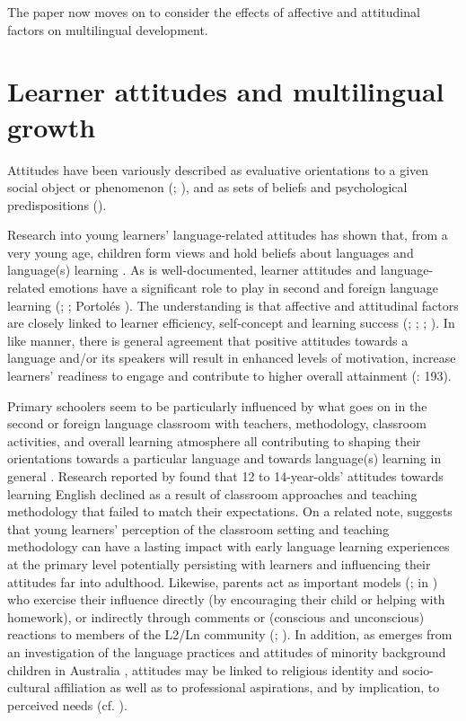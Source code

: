 \documentclass[output=paper]{../langscibook}
\begin{document}
The paper now moves on to consider the effects of affective and attitudinal factors on multilingual development.

\section{Learner attitudes and multilingual growth}


Attitudes have been variously described as evaluative orientations to a given social object or phenomenon (\citealt{Garret2010}; \citealt{Cenoz2004}), and as sets of beliefs and psychological predispositions (\citealt[124]{TodorDegi2016}). 

Research into young learners’ language-related attitudes has shown that, from a very young age, children form views and hold beliefs about languages and language(s) learning \citep{Munoz2014,NagyNikolov2009,Nikolov2009}. As is well-documented, learner attitudes and language-related emotions have a significant role to play in second and foreign language learning (\citealt[3]{CourtneyEtAl2017}; \citealt[58]{Culhane2004}; Portolés \citealt[77]{Falomir2015}). The understanding is that affective and attitudinal factors are closely linked to learner efficiency, self-concept and learning success (\citealt{DornyeiEtAl2015}; \citealt[197]{MacIntyreGregersen2012}; \citealt{MacintyreEtAl2016}; \citealt{Wesely2012}). In like manner, there is general agreement that positive attitudes towards a language and/or its speakers will result in enhanced levels of motivation, increase learners’ readiness to engage and contribute to higher overall attainment (\citealt{MacIntyreGregersen2012}: 193).

Primary schoolers seem to be particularly influenced by what goes on in the second or foreign language classroom with teachers, methodology, classroom activities, and overall learning atmosphere all contributing to shaping their orientations towards a particular language and towards language(s) learning in general \citep{Nikolov1999}. Research reported by \citet[155]{Chambers1999} found that 12 to 14-year-olds’ attitudes towards learning English declined as a result of classroom approaches and teaching methodology that failed to match their expectations. On a related note, \citet[107]{Wesely2012} suggests that young learners’ perception of the classroom setting and teaching methodology can have a lasting impact with early language learning experiences at the primary level potentially persisting with learners and influencing their attitudes far into adulthood. Likewise, parents act as important models (\citealt[205]{Cenoz2004}; \citealt{Gardner1985} in \citealt{CsizerKormos2009}) who exercise their influence directly (by encouraging their child or helping with homework), or indirectly through comments or (conscious and unconscious) reactions to members of the L2/Ln community (\citealt[83]{CsizerKormos2009}; \citealt[347]{OtwinowskaDeAngelis2012}). In addition, as emerges from an investigation of the language practices and attitudes of minority background children in Australia \citep[64]{Bissoonauth2018}, attitudes may be linked to religious identity and socio-cultural affiliation as well as to professional aspirations, and by implication, to perceived needs (cf. \citealt{HerdinaJessner2002}).
\end{document}
